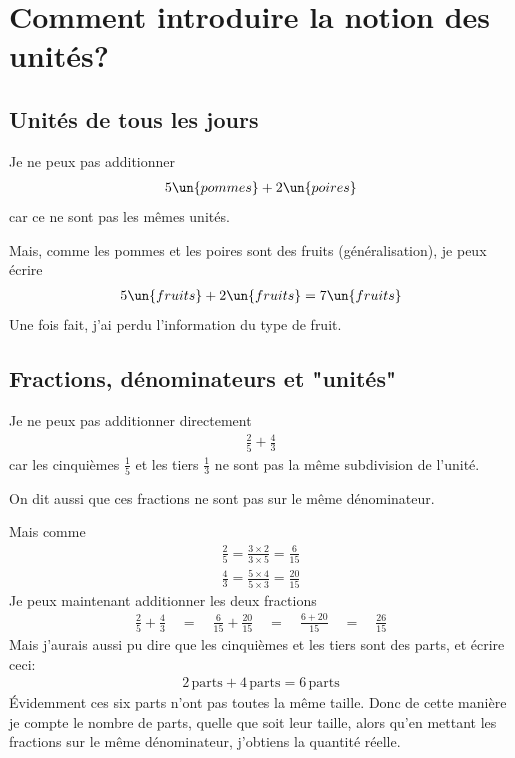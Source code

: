 \section{Comment introduire la notion des unités?}
\subsection{Unités de tous les jours}
Je ne peux pas additionner
\begin{gather*}
    5\un{pommes} + 2\un{poires}
\end{gather*}
car ce ne sont pas les mêmes unités.

Mais, comme les pommes et les poires sont des fruits (généralisation), je peux écrire 
\begin{gather*}
    5\un{fruits} + 2\un{fruits} = 7\un{fruits}
\end{gather*}
Une fois fait, j'ai perdu l'information du type de fruit.

\subsection{Fractions, dénominateurs et "unités"}
Je ne peux pas additionner directement
\begin{gather*}
    \frac{2}{5} + \frac{4}{3}
\end{gather*}
car les cinquièmes $\frac{1}{5}$ et les tiers $\frac{1}{3}$ ne sont pas la même subdivision de l’unité.

On dit aussi que ces fractions ne sont pas sur le même dénominateur.

Mais comme
{\setlength{\jot}{10pt}
\begin{gather*}
    \frac{2}{5} = \frac{3 \times2}{3 \times 5} = \frac{6}{15} \\
    \frac{4}{3} = \frac{5 \times4}{5 \times 3} = \frac{20}{15}
\end{gather*}
}
Je peux maintenant additionner les deux fractions
\begin{gather*}
    \frac{2}{5} + \frac{4}{3} \quad = \quad \frac{6}{15} + \frac{20}{15} \quad=\quad \frac{6+20}{15} \quad = \quad\frac{26}{15}
\end{gather*}
Mais j'aurais aussi pu dire que les cinquièmes et les tiers sont des parts, et écrire ceci:
\begin{gather*}
    2\,\mathrm{parts} + 4\,\mathrm{parts}= 6\,\mathrm{parts}
\end{gather*}
Évidemment ces six parts n'ont pas toutes la même taille. Donc de cette manière je compte le nombre de parts, quelle que soit leur taille, alors qu'en mettant les fractions sur le même dénominateur, j'obtiens la quantité réelle.

